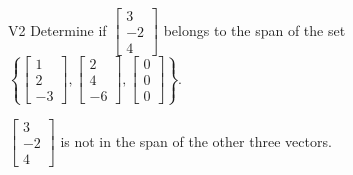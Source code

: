\begin{problem}{V2}
  Determine if
  \(\begin{bmatrix} 3 \\ -2 \\ 4 \end{bmatrix}\)
  belongs to the span of the set
  \(\left\{
    \begin{bmatrix} 1 \\ 2 \\ -3 \end{bmatrix},
    \begin{bmatrix} 2 \\ 4 \\ -6 \end{bmatrix},
    \begin{bmatrix} 0 \\ 0 \\ 0 \end{bmatrix}
    \right\}
  \).
\end{problem}
\begin{solution}
  \(\begin{bmatrix} 3 \\ -2 \\ 4 \end{bmatrix}\) is
  not in the span of the other three vectors.
\end{solution}
